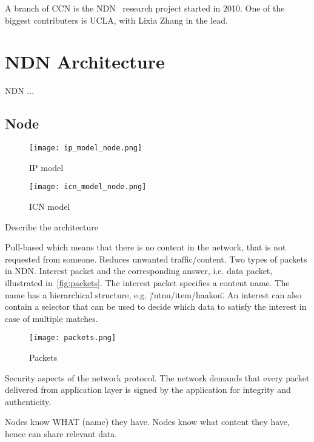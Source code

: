 A branch of \gls{CCN} is the \gls{NDN}~\cite{DBLP:journals/ccr/0001ABJcCPWZ14} research project started in 2010.
One of the biggest contributers is \gls{UCLA}, with Lixia Zhang in the lead.

\section{NDN Architecture}\label{chp2:sec:ndn_architecture}
\gls{NDN} ...


\subsection{Node}
\begin{figure}[ht]
  \centering
  \texttt{[image: ip\_model\_node.png]}
  \caption{\gls{IP} model}
  \label{fig:ip-model-node}
\end{figure}

\begin{figure}[ht]
  \centering
  \texttt{[image: icn\_model\_node.png]}
  \caption{\gls{ICN} model }
  \label{fig:icn-model-node}
\end{figure}

Describe the architecture ~\cite{NDN-0021}

Pull-based which means that there is no content in the network, that is not requested from someone.
Reduces unwanted traffic/content. 
Two types of packets in \gls{NDN}. Interest packet and the corresponding answer, i.e. data packet, illustrated in~\autoref{fig:packets}.
The interest packet specifies a content name. The name has a hierarchical structure, e.g. \"/ntnu/item/haakon\".  
An interest can also contain a selector that can be used to decide which data to satisfy the interest in case of multiple matches.
\begin{figure}[ht]
  \centering
  \texttt{[image: packets.png]}
  \caption{Packets}
  \label{fig:packets}
\end{figure}

Security aspects of the network protocol. 
The network demands that every packet delivered from application layer is signed by the application for integrity and authenticity.

Nodes know WHAT (name) they have. 
Nodes know what content they have, hence can share relevant data.

